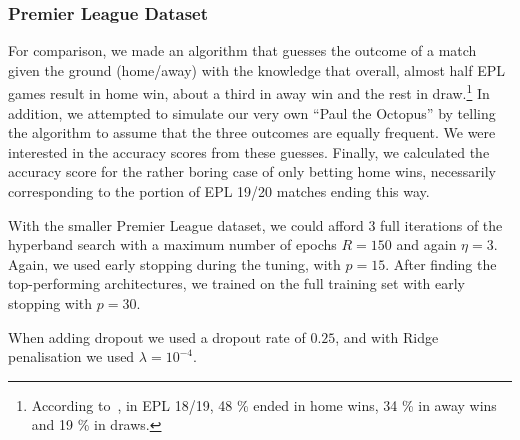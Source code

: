     \subsubsection{Premier League Dataset}
        For comparison, we made an algorithm that guesses the outcome of a match given the ground (home/away) with the knowledge that overall, almost half EPL games result in home win, about a third in away win and the rest in draw.\footnote{According to~\citep{SoccerSTATS}, in EPL 18/19, 48 \% ended in home wins, 34 \% in away wins and 19 \% in draws.} In addition, we attempted to simulate our very own ``Paul the Octopus'' by telling the algorithm to assume that the three outcomes are equally frequent. We were interested in the accuracy scores from these guesses. Finally, we calculated the accuracy score for the rather boring case of only betting home wins, necessarily corresponding to the portion of EPL 19/20 matches ending this way.  

        With the smaller Premier League dataset, we could afford 3 full iterations of the hyperband search with a maximum number of epochs $R=150$ and again $\eta=3$. Again, we used early stopping during the tuning, with $p=15$. After finding the top-performing architectures, we trained on the full training set with early stopping with $p=30$.

        When adding dropout we used a dropout rate of $0.25$, and with Ridge penalisation we used $\lambda=10^{-4}$.

